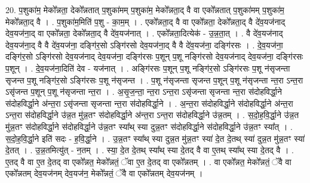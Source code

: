 \documentclass[17pt]{extarticle}
\begin{document}
20. प॒शुका॑म॒ मेको᳚न्नता॒ देको᳚न्नतात् प॒शुका॑मम् प॒शुका॑म॒ मेको᳚न्नता॒द् वै वा एको᳚न्नतात् प॒शुका॑मम् प॒शुका॑म॒ मेको᳚न्नता॒द् वै । . प॒शुका॑म॒मिति॑ प॒शु - का॒म॒म् । . एको᳚न्नता॒द् वै वा एको᳚न्नता॒ देको᳚न्नता॒द् वै दे॑व॒यज॑नाद् देव॒यज॑ना॒द् वा एको᳚न्नता॒ देको᳚न्नता॒द् वै दे॑व॒यज॑नात् । . एको᳚न्नता॒दित्येक॑ - उ॒न्न॒ता॒त् । . वै दे॑व॒यज॑नाद् देव॒यज॑ना॒द् वै वै दे॑व॒यज॑ना॒ दङ्गि॑र॒सो ऽङ्गि॑रसो देव॒यज॑ना॒द् वै वै दे॑व॒यज॑ना॒ दङ्गि॑रसः । . दे॒व॒यज॑ना॒ दङ्गि॑र॒सो ऽङ्गि॑रसो देव॒यज॑नाद् देव॒यज॑ना॒ दङ्गि॑रसः प॒शून् प॒शू नङ्गि॑रसो देव॒यज॑नाद् देव॒यज॑ना॒ दङ्गि॑रसः प॒शून् । . दे॒व॒यज॑ना॒दिति॑ देव - यज॑नात् । . अङ्गि॑रसः प॒शून् प॒शू नङ्गि॑र॒सो ऽङ्गि॑रसः प॒शू न॑सृजन्ता सृजन्त प॒शू नङ्गि॑र॒सो ऽङ्गि॑रसः प॒शू न॑सृजन्त । . प॒शू न॑सृजन्ता सृजन्त प॒शून् प॒शू न॑सृजन्ता न्त॒रा ऽन्त॒रा ऽसृ॑जन्त प॒शून् प॒शू न॑सृजन्ता न्त॒रा । . अ॒सृ॒ज॒न्ता॒ न्त॒रा ऽन्त॒रा ऽसृ॑जन्ता सृजन्ता न्त॒रा स॑दोहविर्द्धा॒ने स॑दोहविर्द्धा॒ने अ॑न्त॒रा ऽसृ॑जन्ता सृजन्ता न्त॒रा स॑दोहविर्द्धा॒ने । . अ॒न्त॒रा स॑दोहविर्द्धा॒ने स॑दोहविर्द्धा॒ने अ॑न्त॒रा ऽन्त॒रा स॑दोहविर्द्धा॒ने उ॑न्न॒त मु॑न्न॒तꣳ स॑दोहविर्द्धा॒ने अ॑न्त॒रा ऽन्त॒रा स॑दोहविर्द्धा॒ने उ॑न्न॒तम् । . स॒दो॒ह॒वि॒र्द्धा॒ने उ॑न्न॒त मु॑न्न॒तꣳ स॑दोहविर्द्धा॒ने स॑दोहविर्द्धा॒ने उ॑न्न॒तꣳ स्या᳚थ् स्या दुन्न॒तꣳ स॑दोहविर्द्धा॒ने स॑दोहविर्द्धा॒ने उ॑न्न॒तꣳ स्या᳚त् । . स॒दो॒ह॒वि॒र्द्धा॒ने इति॑ सदः - ह॒वि॒र्द्धा॒ने । . उ॒न्न॒तꣳ स्या᳚थ् स्या दुन्न॒त मु॑न्न॒तꣳ स्या॑ दे॒त दे॒तथ् स्या॑ दुन्न॒त मु॑न्न॒तꣳ स्या॑ दे॒तत् । . उ॒न्न॒तमित्यु॑त् - न॒तम् । . स्या॒ दे॒त दे॒तथ् स्या᳚थ् स्या दे॒तद् वै वा ए॒तथ् स्या᳚थ् स्या दे॒तद् वै । . ए॒तद् वै वा ए॒त दे॒तद् वा एको᳚न्नत॒ मेको᳚न्नतं॒ ॅवा ए॒त दे॒तद् वा एको᳚न्नतम् । . वा एको᳚न्नत॒ मेको᳚न्नतं॒ ॅवै वा एको᳚न्नतम् देव॒यज॑नम् देव॒यज॑न॒ मेको᳚न्नतं॒ ॅवै वा एको᳚न्नतम् देव॒यज॑नम् । \newline
\end{document}
